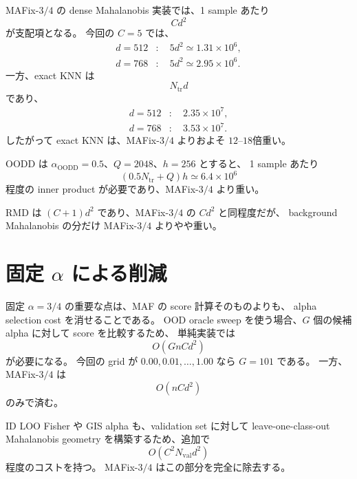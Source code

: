 \documentclass[a4paper,11pt]{ltjsarticle}
\begin{document}
MAFix-$3/4$ の dense Mahalanobis 実装では、1 sample あたり
\begin{equation}
    C d^2
\end{equation}
が支配項となる。
今回の $C=5$ では、
\begin{align}
    d=512 &: \quad 5d^2 \simeq 1.31\times 10^6,\\
    d=768 &: \quad 5d^2 \simeq 2.95\times 10^6.
\end{align}
一方、exact KNN は
\begin{equation}
    N_{\mathrm{tr}}d
\end{equation}
であり、
\begin{align}
    d=512 &: \quad 2.35\times 10^7,\\
    d=768 &: \quad 3.53\times 10^7.
\end{align}
したがって exact KNN は、MAFix-$3/4$ よりおよそ
$12$--$18$倍重い。

OODD は $\alpha_{\mathrm{OODD}}=0.5$、$Q=2048$、$h=256$ とすると、
1 sample あたり
\begin{equation}
    (0.5N_{\mathrm{tr}}+Q)h
    \simeq
    6.4\times 10^6
\end{equation}
程度の inner product が必要であり、MAFix-$3/4$ より重い。

RMD は $(C+1)d^2$ であり、MAFix-$3/4$ の $Cd^2$ と同程度だが、
background Mahalanobis の分だけ MAFix-$3/4$ よりやや重い。

\section{固定 $\alpha$ による削減}

固定 $\alpha=3/4$ の重要な点は、MAF の score 計算そのものよりも、
alpha selection cost を消せることである。
OOD oracle sweep を使う場合、$G$ 個の候補 alpha に対して score を比較するため、
単純実装では
\begin{equation}
    O(G n C d^2)
\end{equation}
が必要になる。
今回の grid が $0.00,0.01,\ldots,1.00$ なら $G=101$ である。
一方、MAFix-$3/4$ は
\begin{equation}
    O(n C d^2)
\end{equation}
のみで済む。

ID LOO Fisher や GIS alpha も、validation set に対して leave-one-class-out
Mahalanobis geometry を構築するため、追加で
\begin{equation}
    O(C^2 N_{\mathrm{val}}d^2)
\end{equation}
程度のコストを持つ。
MAFix-$3/4$ はこの部分を完全に除去する。
\end{document}
